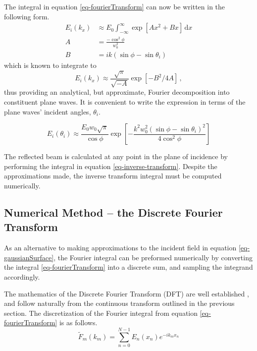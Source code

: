 \documentclass[12pt]{uthesis-v12}
\begin{document}
The integral in equation \ref{eq-fourierTransform} can now be written in the following form.
\begin{align}
E_i(k_x)&\approx E_0\int_{-\infty}^{\infty}\exp\left[Ax^2+Bx\right]\,\mathrm{d}x\\
A&=\frac{-\cos^2\phi}{w_0^2} \\
B&=ik\left(\sin\phi-\sin\theta_i\right)
\end{align}
which is known to integrate to 
\begin{equation}
E_i(k_x)\approx\frac{\sqrt{\pi}}{\sqrt{-A}}\exp[-B^2/4A]\,,
\end{equation}
thus providing an analytical, but approximate, Fourier decomposition into constituent plane waves. It is convenient to write the expression in terms of the plane waves' incident angles, $\theta_i$.

\begin{equation}
E_i(\theta_i)\approx\frac{E_0w_0\sqrt{\pi}}{\cos\phi}\exp\left[
-\frac{k^2w_0^2(\sin\phi-\sin\theta_i)^2}{4\cos^2\phi}
\right]
\end{equation}

The reflected beam is calculated at any point in the plane of incidence by performing the integral in equation \ref{eq-inverse-transform}. Despite the approximations made, the inverse transform integral must be computed numerically.

\subsection{Numerical Method -- the Discrete Fourier Transform}
As an alternative to making approximations to the incident field in equation \ref{eq-gaussianSurface}, the Fourier integral can be preformed numerically by converting the integral \ref{eq-fourierTransform} into a discrete sum, and sampling the integrand accordingly.

The mathematics of the Discrete Fourier Transform (DFT) are well established \cite{fft}, and follow naturally from the continuous transform outlined in the previous section. The discretization of the Fourier integral from equation \ref{eq-fourierTransform} is as follows.
\begin{equation}\label{eq-DFT}
\tilde{F}_m(k_m)=\sum_{n=0}^{N-1} E_n(x_n)e^{-ik_mx_n}
\end{equation}
\end{document}
